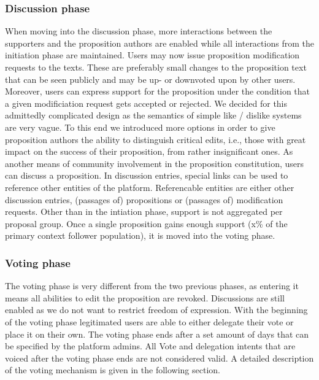 
\subsubsection{Discussion phase}
\label{ssec:Lifecycle_Discussion}

When moving into the discussion phase, more interactions between the supporters and the proposition authors are enabled while all interactions from the initiation phase are maintained.
Users may now issue proposition modification requests to the texts.
These are preferably small changes to the proposition text that can be seen publicly and may be up- or downvoted upon by other users.
Moreover, users can express support for the proposition under the condition that a given modificiation request gets accepted or rejected.
We decided for this admittedly complicated design as the semantics of simple like / dislike systems are very vague.
To this end we introduced more options in order to give proposition authors the ability to distinguish critical edits, i.e., those with great impact on the success of their proposition, from rather insignificant ones.
As another means of community involvement in the proposition constitution, users can discuss a proposition.
In discussion entries, special links can be used to reference other entities of the platform.
Referencable entities are either other discussion entries, (passages of) propositions or (passages of) modification requests.
Other than in the intiation phase, support is not aggregated per proposal group.
Once a single proposition gains enough support (x\% of the primary context follower population), it is moved into the voting phase.

\subsubsection{Voting phase}
\label{ssec:Lifecycle_Voting}

The voting phase is very different from the two previous phases, as entering it means all abilities to edit the proposition are revoked.
Discussions are still enabled as we do not want to restrict freedom of expression.
With the beginning of the voting phase legitimated users are able to either delegate their vote or place it on their own.
The voting phase ends after a set amount of days that can be specified by the platform admins.
All Vote and delegation intents that are voiced after the voting phase ends are not considered valid.
A detailed description of the voting mechanism is given in the following section.

